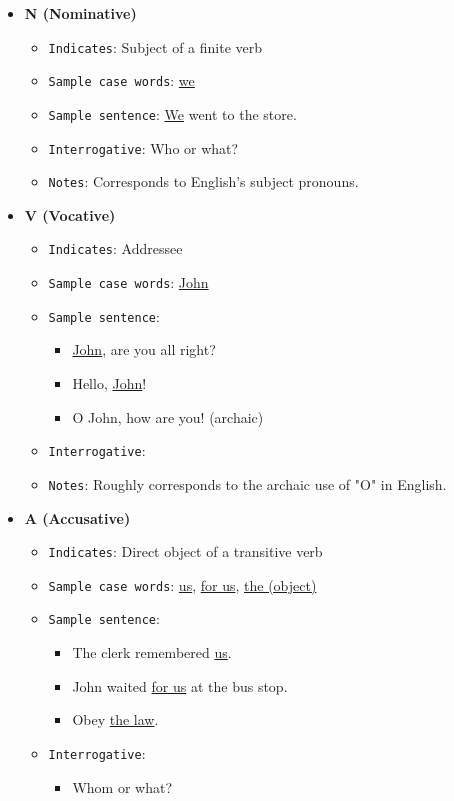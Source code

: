 \documentclass[11pt]{article}
\begin{document}
\begin{itemize}
\item \textbf{N (Nominative)}
\begin{itemize}
\item \texttt{Indicates}: Subject of a finite verb
\item \texttt{Sample case words}: \uline{we}
\item \texttt{Sample sentence}: \uline{We} went to the store.
\item \texttt{Interrogative}: Who or what?
\item \texttt{Notes}: Corresponds to English's subject pronouns.
\end{itemize}
\item \textbf{V (Vocative)}
\begin{itemize}
\item \texttt{Indicates}: Addressee
\item \texttt{Sample case words}: \uline{John}
\item \texttt{Sample sentence}:
\begin{itemize}
\item \uline{John}, are you all right?
\item Hello, \uline{John}!
\item O John, how are you! (archaic)
\end{itemize}
\item \texttt{Interrogative}:
\item \texttt{Notes}: Roughly corresponds to the archaic use of "O" in English.
\end{itemize}
\item \textbf{A (Accusative)}
\begin{itemize}
\item \texttt{Indicates}: Direct object of a transitive verb
\item \texttt{Sample case words}: \uline{us}, \uline{for us}, \uline{the (object)}
\item \texttt{Sample sentence}:
\begin{itemize}
\item The clerk remembered \uline{us}.
\item John waited \uline{for us} at the bus stop.
\item Obey \uline{the law}.
\end{itemize}
\item \texttt{Interrogative}: 
\begin{itemize}
\item Whom or what?
\end{itemize}

\end{itemize}
\end{itemize}
\end{document}
